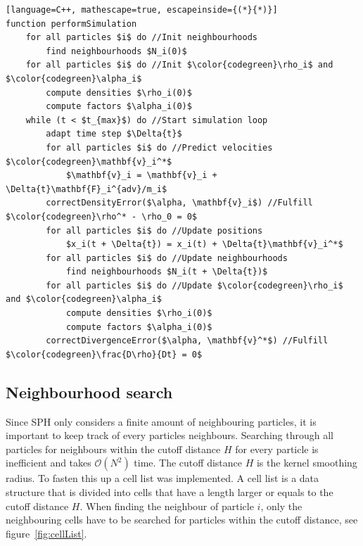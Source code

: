 \begin{lstlisting}[language=C++, mathescape=true, escapeinside={(*}{*)}]
function performSimulation
    for all particles $i$ do //Init neighbourhoods
        find neighbourhoods $N_i(0)$
    for all particles $i$ do //Init $\color{codegreen}\rho_i$ and $\color{codegreen}\alpha_i$
        compute densities $\rho_i(0)$
        compute factors $\alpha_i(0)$
    while (t < $t_{max}$) do //Start simulation loop
        adapt time step $\Delta{t}$ 
        for all particles $i$ do //Predict velocities $\color{codegreen}\mathbf{v}_i^*$
            $\mathbf{v}_i = \mathbf{v}_i + \Delta{t}\mathbf{F}_i^{adv}/m_i$
        correctDensityError($\alpha, \mathbf{v}_i$) //Fulfill $\color{codegreen}\rho^* - \rho_0 = 0$
        for all particles $i$ do //Update positions
            $x_i(t + \Delta{t}) = x_i(t) + \Delta{t}\mathbf{v}_i^*$
        for all particles $i$ do //Update neighbourhoods
            find neighbourhoods $N_i(t + \Delta{t})$
        for all particles $i$ do //Update $\color{codegreen}\rho_i$ and $\color{codegreen}\alpha_i$ 
            compute densities $\rho_i(0)$
            compute factors $\alpha_i(0)$
        correctDivergenceError($\alpha, \mathbf{v}^*$) //Fulfill $\color{codegreen}\frac{D\rho}{Dt} = 0$
\end{lstlisting}

\subsection{Neighbourhood search}
    Since SPH only considers a finite amount of neighbouring particles, it is important to keep track of every particles neighbours.
    Searching through all particles for neighbours within the cutoff distance $H$ for every particle is inefficient and takes $\mathcal{O}({N^2})$ time.
    The cutoff distance $H$ is the kernel smoothing radius.
    To fasten this up a cell list was implemented.
    A cell list is a data structure that is divided into cells that have a length larger or equals to the cutoff distance $H$.
    When finding the neighbour of particle $i$, only the neighbouring cells have to be searched for particles within the cutoff distance, see figure~\ref{fig:cellList}.
    
